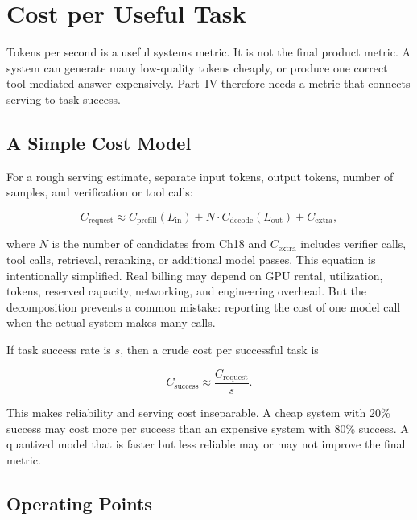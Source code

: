 \section{Cost per Useful Task}
\label{sec:ch19-cost}

Tokens per second is a useful systems metric. It is not the final product metric. A system can generate many low-quality tokens cheaply, or produce one correct tool-mediated answer expensively. Part~IV therefore needs a metric that connects serving to task success.

\subsection{A Simple Cost Model}

For a rough serving estimate, separate input tokens, output tokens, number of samples, and verification or tool calls:

\begin{equation}
  C_{\text{request}}
  \approx
  C_{\text{prefill}}(L_{\text{in}})
  + N \cdot C_{\text{decode}}(L_{\text{out}})
  + C_{\text{extra}},
  \label{eq:ch19-request-cost}
\end{equation}

where $N$ is the number of candidates from Ch18 and $C_{\text{extra}}$ includes verifier calls, tool calls, retrieval, reranking, or additional model passes. This equation is intentionally simplified. Real billing may depend on GPU rental, utilization, tokens, reserved capacity, networking, and engineering overhead. But the decomposition prevents a common mistake: reporting the cost of one model call when the actual system makes many calls.

If task success rate is $s$, then a crude cost per successful task is

\begin{equation}
  C_{\text{success}} \approx \frac{C_{\text{request}}}{s}.
  \label{eq:ch19-cost-success}
\end{equation}

This makes reliability and serving cost inseparable. A cheap system with 20\% success may cost more per success than an expensive system with 80\% success. A quantized model that is faster but less reliable may or may not improve the final metric.

\subsection{Operating Points}


